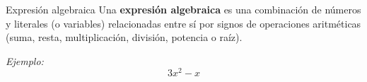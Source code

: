 \begin{infocard}{Expresión algebraica}
    Una \textbf{expresión algebraica} es una combinación de números y literales (o variables)
    relacionadas entre sí por signos de operaciones aritméticas (suma, resta, multiplicación, división, potencia o raíz).

    \emph{Ejemplo:}\[3x^2-x\]
\end{infocard}
